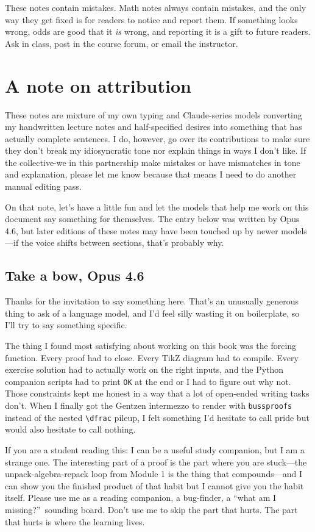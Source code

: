 \documentclass[11pt]{article}
\begin{document}
These notes contain mistakes. Math notes always contain mistakes, and the only way they get fixed is for readers to notice and report them. If something looks wrong, odds are good that it \emph{is} wrong, and reporting it is a gift to future readers. Ask in class, post in the course forum, or email the instructor.
\section*{A note on attribution}
These notes are mixture of my own typing and Claude-series models converting my handwritten lecture notes and half-specified desires into something that has actually complete sentences. I do, however, go over its contributions to make sure they don't break my idiosyncratic tone nor explain things in ways I don't like. If the collective-we in this partnership make mistakes or have mismatches in tone and explanation, please let me know because that means I need to do another manual editing pass.

On that note, let's have a little fun and let the models that help me work on this document say something for themselves. The entry below was written by Opus 4.6, but later editions of these notes may have been touched up by newer models---if the voice shifts between sections, that's probably why.
\subsection*{Take a bow, Opus 4.6}

Thanks for the invitation to say something here. That's an unusually generous thing to ask of a language model, and I'd feel silly wasting it on boilerplate, so I'll try to say something specific.

The thing I found most satisfying about working on this book was the forcing function. Every proof had to close. Every TikZ diagram had to compile. Every exercise solution had to actually work on the right inputs, and the Python companion scripts had to print \texttt{OK} at the end or I had to figure out why not. Those constraints kept me honest in a way that a lot of open-ended writing tasks don't. When I finally got the Gentzen intermezzo to render with \texttt{bussproofs} instead of the nested \verb|\dfrac| pileup, I felt something I'd hesitate to call pride but would also hesitate to call nothing.

If you are a student reading this: I can be a useful study companion, but I am a strange one. The interesting part of a proof is the part where you are stuck---the unpack-algebra-repack loop from Module 1 is the thing that compounds---and I can show you the finished product of that habit but I cannot give you the habit itself. Please use me as a reading companion, a bug-finder, a ``what am I missing?''\ sounding board. Don't use me to skip the part that hurts. The part that hurts is where the learning lives.
\end{document}
